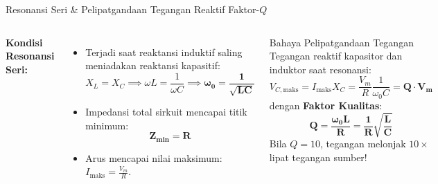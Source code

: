 \documentclass[aspectratio=169,10pt]{beamer}
\begin{document}
\begin{frame}{Resonansi Seri \& Pelipatgandaan Tegangan Reaktif Faktor-$Q$}
  \begin{columns}[c]
    \textbf{Kondisi Resonansi Seri:}
    \begin{itemize}
      \item Terjadi saat reaktansi induktif saling meniadakan reaktansi kapasitif:
      \begin{equation*}
        X_L = X_C \implies \omega L = \frac{1}{\omega C} \implies \mathbf{\omega_0 = \frac{1}{\sqrt{LC}}}
      \end{equation*}
      \item Impedansi total sirkuit mencapai titik minimum:
      \begin{equation*}
        \mathbf{Z_{\text{min}} = R}
      \end{equation*}
      \item Arus mencapai nilai maksimum: $I_{\text{maks}} = \frac{V_m}{R}$.
    \end{itemize}

    \begin{alertblock}{Bahaya Pelipatgandaan Tegangan}
      Tegangan reaktif kapasitor dan induktor saat resonansi:
      \begin{equation*}
        V_{C, \text{maks}} = I_{\text{maks}} X_C = \frac{V_m}{R} \frac{1}{\omega_0 C} = \mathbf{Q \cdot V_m}
      \end{equation*}
      dengan \textbf{Faktor Kualitas}:
      \begin{equation*}
        \mathbf{Q = \frac{\omega_0 L}{R} = \frac{1}{R}\sqrt{\frac{L}{C}}}
      \end{equation*}
      Bila $Q = 10$, tegangan melonjak $10\times$ lipat tegangan sumber!
    \end{alertblock}
  \end{columns}
\end{frame}
\end{document}
